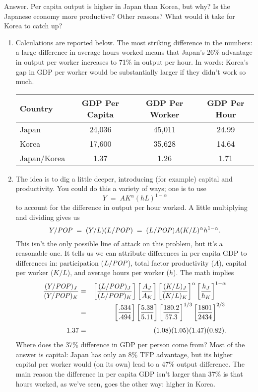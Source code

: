 \documentclass[letterpaper,12pt]{article}
\newcommand{\POP}{\mbox{\it POP\/}}
\begin{document}
\begin{enumerate}
Answer.
Per capita output is higher in Japan than Korea, but why?
Is the Japanese economy more productive?  Other reasons?  
What would it take for Korea to catch up?  
\begin{enumerate}
\item Calculations are reported below.  
The most striking difference in the numbers:  
a large difference in average hours worked means 
that Japan's 26\% advantage in output per worker 
increases to 71\% in output per hour.  
In words:  Korea's gap in GDP per worker would be substantially 
larger if they didn't work so much.  
\begin{center}
\begin{tabular}{lccc}
\hline\hline
Country   &  GDP Per Capita &  GDP Per Worker &  GDP Per Hour \\
\hline\hline
Japan       &  24,036  & 45,011 &  24.99 \\
Korea       &  17,600  & 35,628 &  14.64 \\
Japan/Korea &  1.37 &  1.26 &  1.71 \\
\hline\hline
\end{tabular}
\end{center}

\item The idea is to dig a little deeper, 
introducing (for example) capital and productivity.  
You could do this a variety of ways; 
one is to use 
\[
    Y \;=\; A K^\alpha (h L)^{1-\alpha} 
\]
to account for the difference in output per hour worked.  
A little multiplying and dividing gives us 
\[
    Y/\POP \;=\; (Y/L) (L/\POP) \;=\; (L/\POP) A (K/L)^\alpha h^{1-\alpha} .
\]
This isn't the only possible line of attack on this problem, but
it's a reasonable one.  It tells us we can attribute differences
in per capita GDP to differences in:  participation ($L/\POP$),
total factor productivity ($A$), capital per worker ($K/L$), 
and average hours per worker ($h$). 
The math implies
%
\begin{eqnarray*}
    \frac{(Y/\POP)_{J}}{(Y/\POP)_{K}} &=&
             \left[ \frac{(L/\POP)_J}{(L/\POP)_{K}} \right]
             \left[ \frac{A_J}{A_{K}} \right]
             \left[ \frac{(K/L)_{J}}{(K/L)_{K}} \right]^\alpha
             \left[ \frac{h_{J}}{h_{K}} \right]^{1-\alpha} \\
             &=& \left[ \frac{.534}{.494} \right]
                 \left[ \frac{5.38}{5.11} \right]
                 \left[ \frac{180.2}{57.3} \right]^{1/3}
                 \left[ \frac{1801}{2434} \right]^{2/3}_{\phantom{\sum_i}} \\
      1.37   &=& (1.08)(1.05) (1.47) (0.82) .
\end{eqnarray*}
%
Where does the 37\% difference in GDP per person come from?
Most of the answer is capital: 
Japan has only an 8\% TFP advantage, 
but its higher capital per worker would (on its own) 
lead to a 47\% output difference.  
The main reason the difference in per capita GDP isn't larger than 37\% 
is that hours worked, as we've seen, goes the other way:  
higher in Korea.  



\end{enumerate}
\end{enumerate}
\end{document}
